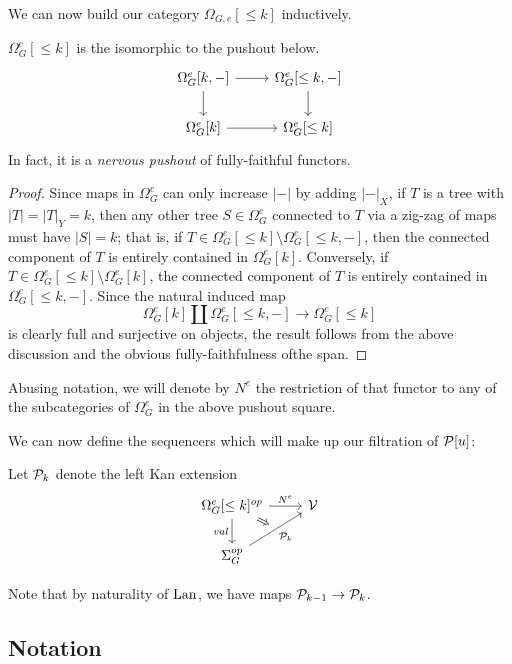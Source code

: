 \documentclass[a4paper,10pt]{article}%
\begin{document}
We can now build our category $\Omega_{G,e}[\leq k]$ inductively.

\begin{lemma}
  \label{TREE_CATS_DECOMP_LEMMA}
  $\Omega_G^e[\leq k]$ is the isomorphic to the pushout below.
  \[
  \begin{tikzcd}
    \Omega_G^{e}[k,-] \arrow[d] \arrow[r] & \Omega_G^{e}[\leq k,-] \arrow[d]\\
    \Omega_G^e[k] \arrow[r] & \Omega_G^e[\leq k]
  \end{tikzcd}
  \]
  In fact, it is a \textit{nervous pushout} of fully-faithful functors.%
\end{lemma}
\begin{proof}
  Since maps in $\Omega_G^e$ can only increase $|-|$ by adding $|-|_X$, if $T$ is a tree with $|T| = |T|_Y = k$, then any other tree $S\in \Omega_G^e$ connected to $T$ via a zig-zag of maps must have $|S| = k$; that is, if $T\in \Omega_G^e[\leq k] \setminus \Omega_G^e[\leq k, -]$, then the connected component of $T$ is entirely contained in $\Omega_G^e[k]$. Conversely, if $T \in \Omega_G^e[\leq k] \setminus \Omega_G^e[k]$, the connected component of $T$ is entirely contained in $\Omega_G^e[\leq k,-]$. Since the natural induced map
  \[
  \Omega_G^e[k] \amalg \Omega_G^e[\leq k,-] \to \Omega_G^e[\leq k]
  \]
  is clearly full and surjective on objects, the result follows from the above discussion and the obvious fully-faithfulness ofthe span. 
\end{proof}

Abusing notation, we will denote by $N^e$ the restriction of that functor to any of the subcategories of $\Omega_G^e$ in the above pushout square.

We can now define the sequencers which will make up our filtration of $\P[u]$:
\begin{definition}
  Let $\P_k$ denote the left Kan extension
\[
\begin{tikzcd}
  |[alias=U]| \Omega_G^e[\leq k]^{op} \arrow[r, "N^e"] \arrow[d, "val"'] & \V\\
  \Sigma_G^{op} \arrow[ur, "\P_k"', ""{name=V}]
  \arrow[Rightarrow, from=U, to=V]
\end{tikzcd}
\]
\end{definition}

Note that by naturality of $\Lan$, we have maps $\P_{k-1} \to \P_k$.

\subsection{Notation}
\end{document}
